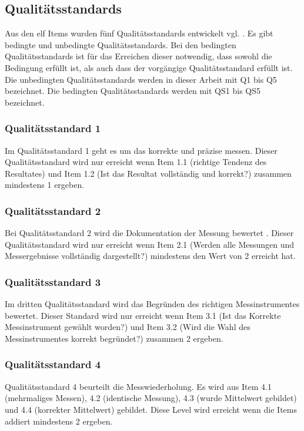\subsection{Qualitätsstandards}
Aus den elf Items wurden fünf Qualitätsstandards entwickelt vgl. \citet{Hild2014a, Gut2013a}. Es gibt bedingte und unbedingte Qualitätsstandards. Bei den bedingten Qualitätsstandards ist für das Erreichen dieser notwendig, dass sowohl die Bedingung erfüllt ist, als auch dass der vorgängige Qualitätsstandard erfüllt ist. Die unbedingten Qualitätsstandards werden in dieser Arbeit mit Q1 bis Q5 bezeichnet. Die bedingten Qualitätsstandards werden mit QS1 bis QS5 bezeichnet.
\subsubsection*{Qualitätsstandard 1}
Im Qualitätsstandard 1 geht es um das korrekte und präzise messen. Dieser Qualitätsstandard wird nur erreicht wenn Item 1.1 (richtige Tendenz des Resultates) und Item 1.2 (Ist das Resultat vollständig und korrekt?) zusammen mindestens 1 ergeben.


\subsubsection*{Qualitätsstandard 2}
Bei Qualitätsstandard 2 wird die Dokumentation der Messung bewertet . Dieser Qualitätsstandard wird nur erreicht wenn Item 2.1 (Werden alle Messungen und Messergebnisse vollständig dargestellt?) mindestens den Wert von 2 erreicht hat. 

\subsubsection*{Qualitätsstandard 3}
Im dritten Qualitätsstandard wird das Begründen des richtigen Messinstrumentes bewertet. Dieser Standard wird nur erreicht wenn Item 3.1 (Ist das Korrekte Messinstrument gewählt worden?) und Item 3.2 (Wird die Wahl des Messinstrumentes korrekt begründet?) zusammen 2 ergeben.

\subsubsection*{Qualitätsstandard 4}
Qualitätsstandard 4 beurteilt die Messwiederholung. Es wird aus Item 4.1 (mehrmaliges Messen), 4.2 (identische Messung), 4.3 (wurde Mittelwert gebildet) und 4.4 (korrekter Mittelwert) gebildet. Diese Level wird erreicht wenn die Items addiert mindestens 2 ergeben.

